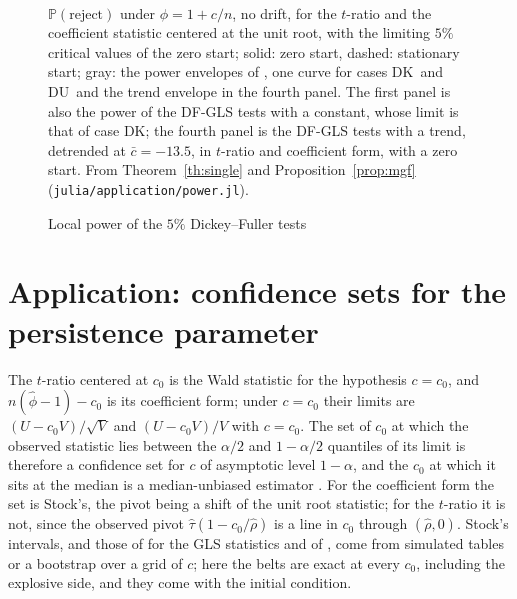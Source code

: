 \documentclass[ecta,nameyear,final]{econsocart}
\newcommand{\PP}{{\mathbb P}}
\newcommand{\Fk}{\textsf{\upshape DK}}
\newcommand{\Fu}{\textsf{\upshape DU}}
\theoremstyle{plain}
\theoremstyle{definition}
\begin{document}
\begin{figure}[tbp]
\begin{center}
\\[0.4ex]
\end{center}
\caption{Local power of the $5\%$ Dickey--Fuller tests}
\label{fig:power}
{\small $\PP(\text{reject})$ under $\phi=1+c/n$, no drift, for the $t$-ratio and the coefficient statistic centered at the unit root, with the limiting $5\%$ critical values of the zero start; solid: zero start, dashed: stationary start; gray: the power envelopes of \cite{ElliottRothenbergStock1996}, one curve for cases \Fk\ and \Fu\ and the trend envelope in the fourth panel.  The first panel is also the power of the DF-GLS tests with a constant, whose limit is that of case \Fk; the fourth panel is the DF-GLS tests with a trend, detrended at $\bar c=-13.5$, in $t$-ratio and coefficient form, with a zero start.  From Theorem~\ref{th:single} and Proposition~\ref{prop:mgf} (\texttt{julia/application/power.jl}).}
\end{figure}

\section{Application: confidence sets for the persistence parameter}
\label{sec:ci}

The $t$-ratio centered at $c_0$ is the Wald statistic for the hypothesis $c=c_0$, and $n(\hat\phi-1)-c_0$ is its coefficient form; under $c=c_0$ their limits are $(U-c_0V)/\sqrt V$ and $(U-c_0V)/V$ with $c=c_0$.  The set of $c_0$ at which the observed statistic lies between the $\alpha/2$ and $1-\alpha/2$ quantiles of its limit is therefore a confidence set for $c$ of asymptotic level $1-\alpha$, and the $c_0$ at which it sits at the median is a median-unbiased estimator \citep{Stock1991,Andrews1993}.  For the coefficient form the set is Stock's, the pivot being a shift of the unit root statistic; for the $t$-ratio it is not, since the observed pivot $\hat\tau(1-c_0/\hat\rho)$ is a line in $c_0$ through $(\hat\rho,0)$.  Stock's intervals, and those of \cite{ElliottStock2001} for the GLS statistics and of \cite{Hansen1999}, come from simulated tables or a bootstrap over a grid of $c$; here the belts are exact at every $c_0$, including the explosive side, and they come with the initial condition.
\end{document}
